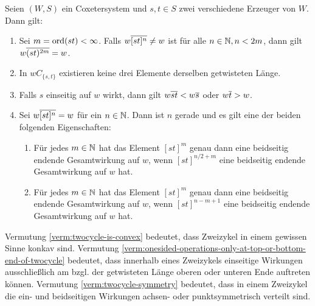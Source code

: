 \begin{verm}
Seien $(W,S)$ ein Coxetersystem und $s,t \in S$ zwei verschiedene Erzeuger
von $W$. Dann gilt:
\begin{enumerate}
  \item \label{verm:max-twocycle-length} Sei $m = \operatorname{ord} (st) < \infty$. Falls
  $w \overline{[st]^n} \neq w$ ist für alle $n \in \mathbb{N}, n < 2m$, dann gilt $w \overline{(st)^{2m}} = w$.
  \item \label{verm:twocycle-is-convex} In $wC_{\{s,t\}}$ existieren keine drei
  Elemente derselben getwisteten Länge.
  \item \label{verm:onesided-operations-only-at-top-or-bottom-end-of-twocycle}
  Falls $s$ einseitig auf $w$ wirkt, dann gilt $w \overline{st} < w \overline{s}$ oder $w
  \overline{t} > w$.
  \item \label{verm:twocycle-symmetry} Sei $w \overline{[st]^n} = w$ für ein $n \in
  \mathbb{N}$. Dann ist $n$ gerade und es gilt eine der beiden folgenden Eigenschaften:
  	\begin{enumerate}
  	  \item Für jedes $m \in \mathbb{N}$ hat das Element $[st]^m$ genau dann eine
  	  beidseitig endende Gesamtwirkung auf $w$, wenn $[st]^{n/2+m}$ eine beidseitig endende
  	  Gesamtwirkung auf $w$ hat.
  	  \item Für jedes $m \in \mathbb{N}$ hat das Element $[st]^m$ genau dann eine
  	  beidseitig endende Gesamtwirkung auf $w$, wenn $[st]^{n-m+1}$ eine beidseitig endende
  	  Gesamtwirkung auf $w$ hat.
  	\end{enumerate}
\end{enumerate}
\end{verm}

\begin{anm}
	Vermutung \ref{verm:twocycle-is-convex} bedeutet, dass Zweizykel in einem
	gewissen Sinne konkav sind. Vermutung
	\ref{verm:onesided-operations-only-at-top-or-bottom-end-of-twocycle} bedeutet,
	dass innerhalb eines Zweizykels einseitige Wirkungen ausschließlich am
	bzgl. der getwisteten Länge oberen oder unteren Ende auftreten können.
	Vermutung \ref{verm:twocycle-symmetry} bedeutet, dass in einem Zweizykel die
	ein- und beidseitigen Wirkungen achsen- oder punktsymmetrisch verteilt sind.
\end{anm}

